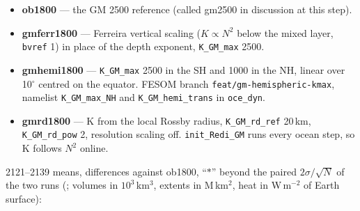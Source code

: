 \documentclass[10pt]{article}
\begin{document}
\begin{itemize}\itemsep1pt
\item \textbf{ob1800} --- the GM 2500 reference (called gm2500 in discussion at this step).
\item \textbf{gmferr1800} --- Ferreira vertical scaling ($K\propto N^2$ below the mixed layer,
      \texttt{bvref} 1) in place of the depth exponent, \texttt{K\_GM\_max} 2500.
\item \textbf{gmhemi1800} --- \texttt{K\_GM\_max} 2500 in the SH and 1000 in the NH, linear over
      10$^\circ$ centred on the equator. FESOM branch \texttt{feat/gm-hemispheric-kmax}, namelist
      \texttt{K\_GM\_max\_NH} and \texttt{K\_GM\_hemi\_trans} in \texttt{oce\_dyn}.
\item \textbf{gmrd1800} --- K from the local Rossby radius, \texttt{K\_GM\_rd\_ref} 20\,km,
      \texttt{K\_GM\_rd\_pow} 2, resolution scaling off. \texttt{init\_Redi\_GM} runs every ocean
      step, so K follows $N^2$ online.
\end{itemize}

2121--2139 means, differences against ob1800, ``$*$'' beyond the paired $2\sigma/\sqrt{N}$ of the
two runs (; volumes in $10^3$\,km$^3$, extents in
M\,km$^2$, heat in W\,m$^{-2}$ of Earth surface):
\end{document}
